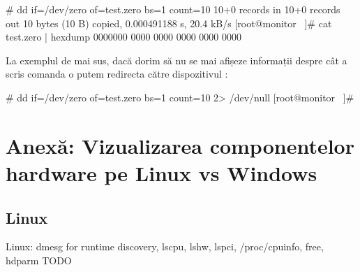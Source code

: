 \begin{screen}
# dd if=/dev/zero of=test.zero bs=1 count=10
10+0 records in
10+0 records out
10 bytes (10 B) copied, 0.000491188 s, 20.4 kB/s
[root@monitor ~]# cat test.zero | hexdump
0000000 0000 0000 0000 0000 0000
\end{screen}

La exemplul de mai sus, dacă dorim să nu se mai afișeze informații despre cât a
scris comanda  o putem redirecta către dispozitivul :

\begin{screen}
# dd if=/dev/zero of=test.zero bs=1 count=10 2> /dev/null
[root@monitor ~]#
\end{screen}

\section{Anexă: Vizualizarea componentelor hardware pe Linux vs Windows}
\label{sec:hardware-virtualizare}

\subsection{Linux}
\label{sec:hardware-virtualizare-linux}

Linux: dmesg for runtime discovery, lscpu, lshw, lspci, /proc/cpuinfo, free,
hdparm TODO

